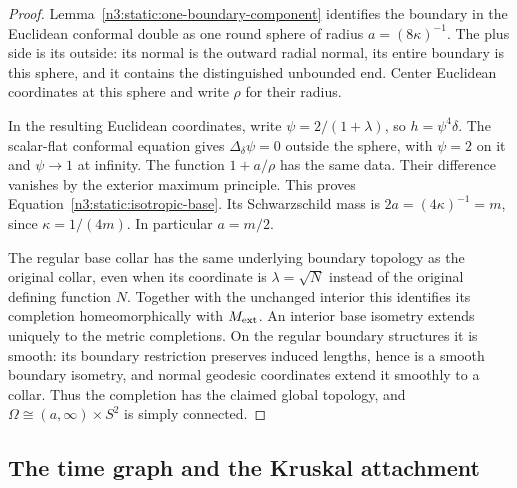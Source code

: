 \begin{proof}
Lemma~\ref{n3:static:one-boundary-component} identifies the boundary
in the Euclidean conformal double as one round sphere of radius
$a=(8\kappa)^{-1}$. The plus side is its outside: its normal is the
outward radial normal, its entire boundary is this sphere, and it
contains the distinguished unbounded end. Center Euclidean
coordinates at this sphere and write $\rho$ for their radius.

In the resulting Euclidean coordinates, write
\(\psi=2/(1+\lambda)\), so \(h=\psi^4\delta\).
The scalar-flat conformal equation gives \(\Delta_\delta\psi=0\)
outside the sphere, with \(\psi=2\) on it and \(\psi\to1\)
at infinity. The function \(1+a/\rho\) has the same data.
Their difference vanishes by the exterior maximum principle.
This proves Equation~\eqref{n3:static:isotropic-base}.
Its Schwarzschild mass is $2a=(4\kappa)^{-1}=m$, since
$\kappa=1/(4m)$. In particular $a=m/2$.

The regular base collar has the same underlying boundary topology
as the original collar, even when its coordinate is
\(\lambda=\sqrt N\) instead of the original defining function \(N\).
Together with the unchanged interior this identifies its completion
homeomorphically with \(M_{\mathrm{ext}}\).
An interior base isometry extends uniquely to the metric completions.
On the regular boundary structures it is smooth: its boundary
restriction preserves induced lengths, hence is a smooth boundary
isometry, and normal geodesic coordinates extend it smoothly to
a collar.
Thus the completion has the claimed global topology, and
\(\Omega\cong(a,\infty)\times S^2\) is simply connected.
\end{proof}

\subsection{The time graph and the Kruskal attachment}
\label{n3:static:embedding-subsection}

